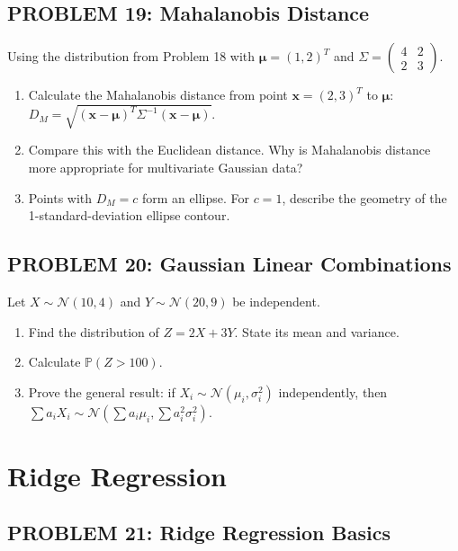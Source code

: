 \documentclass[12pt]{article}
\begin{document}
\subsection*{PROBLEM 19: Mahalanobis Distance}

Using the distribution from Problem 18 with \(\boldsymbol{\mu} = (1, 2)^T\) and \(\Sigma = \begin{pmatrix} 4 & 2 \\ 2 & 3 \end{pmatrix}\).

\begin{enumerate}
\item[(a)] Calculate the Mahalanobis distance from point \(\mathbf{x} = (2, 3)^T\) to \(\boldsymbol{\mu}\): \(D_M = \sqrt{(\mathbf{x}-\boldsymbol{\mu})^T\Sigma^{-1}(\mathbf{x}-\boldsymbol{\mu})}\).
\item[(b)] Compare this with the Euclidean distance. Why is Mahalanobis distance more appropriate for multivariate Gaussian data?
\item[(c)] Points with \(D_M = c\) form an ellipse. For \(c = 1\), describe the geometry of the 1-standard-deviation ellipse contour.
\end{enumerate}

\subsection*{PROBLEM 20: Gaussian Linear Combinations}

Let \(X \sim \mathcal{N}(10, 4)\) and \(Y \sim \mathcal{N}(20, 9)\) be independent.

\begin{enumerate}
\item[(a)] Find the distribution of \(Z = 2X + 3Y\). State its mean and variance.
\item[(b)] Calculate \(\mathbb{P}(Z > 100)\).
\item[(c)] Prove the general result: if \(X_i \sim \mathcal{N}(\mu_i, \sigma_i^2)\) independently, then \(\sum a_i X_i \sim \mathcal{N}(\sum a_i\mu_i, \sum a_i^2\sigma_i^2)\).
\end{enumerate}

\newpage
\section*{Ridge Regression}

\subsection*{PROBLEM 21: Ridge Regression Basics}
\end{document}
